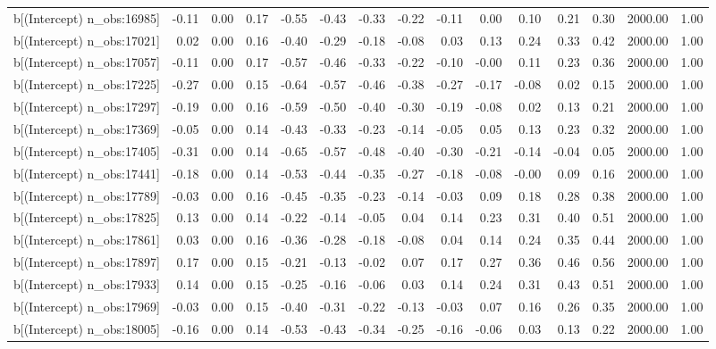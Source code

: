 \begin{table}[ht]
\begin{tabular}{rrrrrrrrrrrrrrr}
  b[(Intercept) n\_obs:16985] & -0.11 & 0.00 & 0.17 & -0.55 & -0.43 & -0.33 & -0.22 & -0.11 & 0.00 & 0.10 & 0.21 & 0.30 & 2000.00 & 1.00 \\ 
  b[(Intercept) n\_obs:17021] & 0.02 & 0.00 & 0.16 & -0.40 & -0.29 & -0.18 & -0.08 & 0.03 & 0.13 & 0.24 & 0.33 & 0.42 & 2000.00 & 1.00 \\ 
  b[(Intercept) n\_obs:17057] & -0.11 & 0.00 & 0.17 & -0.57 & -0.46 & -0.33 & -0.22 & -0.10 & -0.00 & 0.11 & 0.23 & 0.36 & 2000.00 & 1.00 \\ 
  b[(Intercept) n\_obs:17225] & -0.27 & 0.00 & 0.15 & -0.64 & -0.57 & -0.46 & -0.38 & -0.27 & -0.17 & -0.08 & 0.02 & 0.15 & 2000.00 & 1.00 \\ 
  b[(Intercept) n\_obs:17297] & -0.19 & 0.00 & 0.16 & -0.59 & -0.50 & -0.40 & -0.30 & -0.19 & -0.08 & 0.02 & 0.13 & 0.21 & 2000.00 & 1.00 \\ 
  b[(Intercept) n\_obs:17369] & -0.05 & 0.00 & 0.14 & -0.43 & -0.33 & -0.23 & -0.14 & -0.05 & 0.05 & 0.13 & 0.23 & 0.32 & 2000.00 & 1.00 \\ 
  b[(Intercept) n\_obs:17405] & -0.31 & 0.00 & 0.14 & -0.65 & -0.57 & -0.48 & -0.40 & -0.30 & -0.21 & -0.14 & -0.04 & 0.05 & 2000.00 & 1.00 \\ 
  b[(Intercept) n\_obs:17441] & -0.18 & 0.00 & 0.14 & -0.53 & -0.44 & -0.35 & -0.27 & -0.18 & -0.08 & -0.00 & 0.09 & 0.16 & 2000.00 & 1.00 \\ 
  b[(Intercept) n\_obs:17789] & -0.03 & 0.00 & 0.16 & -0.45 & -0.35 & -0.23 & -0.14 & -0.03 & 0.09 & 0.18 & 0.28 & 0.38 & 2000.00 & 1.00 \\ 
  b[(Intercept) n\_obs:17825] & 0.13 & 0.00 & 0.14 & -0.22 & -0.14 & -0.05 & 0.04 & 0.14 & 0.23 & 0.31 & 0.40 & 0.51 & 2000.00 & 1.00 \\ 
  b[(Intercept) n\_obs:17861] & 0.03 & 0.00 & 0.16 & -0.36 & -0.28 & -0.18 & -0.08 & 0.04 & 0.14 & 0.24 & 0.35 & 0.44 & 2000.00 & 1.00 \\ 
  b[(Intercept) n\_obs:17897] & 0.17 & 0.00 & 0.15 & -0.21 & -0.13 & -0.02 & 0.07 & 0.17 & 0.27 & 0.36 & 0.46 & 0.56 & 2000.00 & 1.00 \\ 
  b[(Intercept) n\_obs:17933] & 0.14 & 0.00 & 0.15 & -0.25 & -0.16 & -0.06 & 0.03 & 0.14 & 0.24 & 0.31 & 0.43 & 0.51 & 2000.00 & 1.00 \\ 
  b[(Intercept) n\_obs:17969] & -0.03 & 0.00 & 0.15 & -0.40 & -0.31 & -0.22 & -0.13 & -0.03 & 0.07 & 0.16 & 0.26 & 0.35 & 2000.00 & 1.00 \\ 
  b[(Intercept) n\_obs:18005] & -0.16 & 0.00 & 0.14 & -0.53 & -0.43 & -0.34 & -0.25 & -0.16 & -0.06 & 0.03 & 0.13 & 0.22 & 2000.00 & 1.00 \\ 

\end{tabular}
\end{table}
